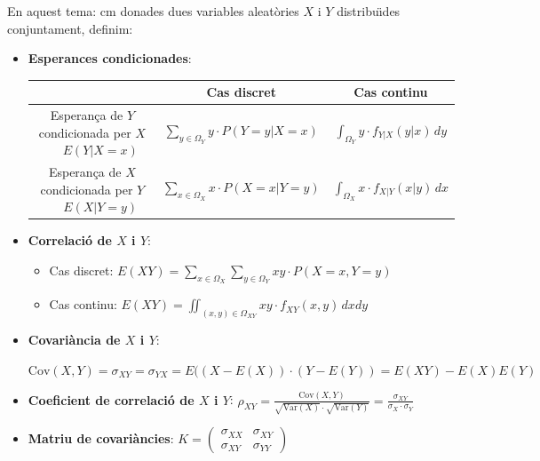 \documentclass{article}
\begin{document}
\vskip 1cm
\noindent
En aquest tema:
 cm
donades dues variables aleat\`ories $X$ i $Y$ distribu\"\i des conjuntament, definim:

\begin{itemize}
\item \textbf{Esperances condicionades}:

\begin{tabular}{c|c|c|}
 & Cas discret & Cas continu \\ \hline
Esperan\c{c}a de $Y$ condicionada per $X$ $\quad$ $E(Y|X=x)$ & 
$\displaystyle \sum_{y \in \Omega_Y} y \cdot P(Y=y | X=x)$ & 
$\displaystyle \int_{\Omega_Y} y \cdot f_{Y|X}(y|x) \, dy$ \\ \hline
Esperan\c{c}a de $X$ condicionada per $Y$ $\quad$ $E(X|Y=y)$ & 
$\displaystyle \sum_{x \in \Omega_X} x \cdot P(X=x | Y=y)$ & 
$\displaystyle \int_{\Omega_X} x \cdot f_{X|Y}(x|y) \, dx$ \\ \hline 
\end{tabular}

\item \textbf{Correlaci\'o de $X$ i $Y$}:
\begin{itemize}
\item Cas discret: $\displaystyle E(XY)=\sum_{x \in \Omega_X} \sum_{y \in \Omega_Y} xy \cdot P(X=x, Y=y)$
\item Cas continu: $\displaystyle E(XY)=\iint_{(x, y) \in \Omega_{XY}} xy \cdot f_{XY}(x, y) \, dxdy$
\end{itemize}

\item \textbf{Covari\`ancia de $X$ i $Y$}: 

$\mathrm{Cov}(X, Y)=\sigma_{XY}=\sigma_{YX}=E((X-E(X))\cdot (Y-E(Y))=E(XY)-E(X)E(Y)$

\item \textbf{Coeficient de correlaci\'o de $X$ i $Y$}: 
$\displaystyle \rho_{XY}=\frac{\mathrm{Cov}(X, Y)}{\sqrt{\mathrm{Var}(X)} \cdot \sqrt{\mathrm{Var}(Y)}}=
\frac{\sigma_{XY}}{\sigma_X \cdot \sigma_Y}$

\item \textbf{Matriu de covari\`ancies}: 
$\displaystyle  K=\begin{pmatrix} \sigma_{XX} & \sigma_{XY} \\ \sigma_{XY} & \sigma_{YY} \end{pmatrix}$
\end{itemize}
\end{document}
